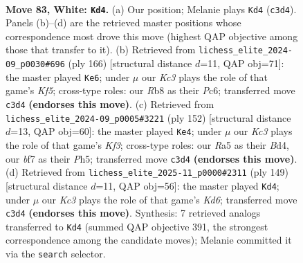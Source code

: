 \documentclass[11pt]{article}
\begin{document}
\clearpage

\begin{figure}[p]\centering
\begin{subfigure}{0.46\textwidth}\centering
\resizebox{\linewidth}{!}{%
\newchessgame
\chessboard[
  setfen={1R6/3k1b2/8/R7/1P6/2K3r1/8/8 w - - 39 83},
  showmover=false,
  pgfstyle=straightmove, color=movearrow, markmove={c3-d4}
]}
\caption{}
\end{subfigure}\hfill
\begin{subfigure}{0.46\textwidth}\centering
\resizebox{\linewidth}{!}{%
\newchessgame
\chessboard[
  setfen={3k4/8/2P4R/5K2/4P3/8/8/5r2 w - - 3 84},
  showmover=false,
  pgfstyle=straightmove, color=movearrow, markmove={f5-e6}
]}
\caption{}
\end{subfigure}
\\[4pt]
\begin{subfigure}{0.46\textwidth}\centering
\resizebox{\linewidth}{!}{%
\newchessgame
\chessboard[
  setfen={5r2/8/4k3/6RP/3B4/5K2/6P1/8 w - - 3 77},
  showmover=false,
  pgfstyle=straightmove, color=movearrow, markmove={f3-e4}
]}
\caption{}
\end{subfigure}\hfill
\begin{subfigure}{0.46\textwidth}\centering
\resizebox{\linewidth}{!}{%
\newchessgame
\chessboard[
  setfen={8/8/8/8/4p3/R2k4/6K1/4r3 b - - 39 75},
  showmover=false,
  pgfstyle=straightmove, color=movearrow, markmove={d3-d4}
]}
\caption{}
\end{subfigure}
\caption{\textbf{Move 83, White: \texttt{Kd4}.} (a) Our position; Melanie plays \texttt{Kd4} (\texttt{c3d4}). Panels (b)--(d) are the retrieved master positions whose correspondence most drove this move (highest QAP objective among those that transfer to it). (b) Retrieved from \texttt{lichess\_elite\_2024-09\_p0030\#696} (ply 166) [structural distance $d$=11, QAP obj=71]: the master played \texttt{Ke6}; under $\mu$ our \emph{Kc3} plays the role of that game's \emph{Kf5}; cross-type roles: our \emph{R}b8 as their \emph{P}c6; transferred move \texttt{c3d4} \textbf{(endorses this move)}. (c) Retrieved from \texttt{lichess\_elite\_2024-09\_p0005\#3221} (ply 152) [structural distance $d$=13, QAP obj=60]: the master played \texttt{Ke4}; under $\mu$ our \emph{Kc3} plays the role of that game's \emph{Kf3}; cross-type roles: our \emph{R}a5 as their \emph{B}d4, our \emph{b}f7 as their \emph{P}h5; transferred move \texttt{c3d4} \textbf{(endorses this move)}. (d) Retrieved from \texttt{lichess\_elite\_2025-11\_p0000\#2311} (ply 149) [structural distance $d$=11, QAP obj=56]: the master played \texttt{Kd4}; under $\mu$ our \emph{Kc3} plays the role of that game's \emph{Kd6}; transferred move \texttt{c3d4} \textbf{(endorses this move)}. Synthesis: 7 retrieved analogs transferred to \texttt{Kd4} (summed QAP objective 391, the strongest correspondence among the candidate moves); Melanie committed it via the \texttt{search} selector.}
\label{fig:thought-m164}
\end{figure}
\end{document}
